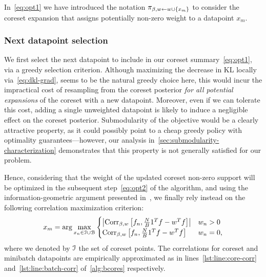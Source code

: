 In~\cref{eq:opt1} we have introduced the notation $\pi_{\beta,w \leftarrow w \cup \{x_{m}\}}$ to consider the coreset expansion that assigns potentially non-zero weight to a datapoint $x_m$.

\subsubsection{Next datapoint selection}
We first select the next datapoint to include in our coreset summary~\cref{eq:opt1}, via a greedy selection criterion. Although maximizing the decrease in KL locally via~\cref{eq:dkl-grad}, seems to be the natural greedy choice here, this would incur the impractical cost of resampling from the coreset posterior \emph{for all potential expansions} of the coreset with a new datapoint. Moreover, even if we can tolerate this cost, adding a single unweighted datapoint is likely to induce a negligible effect on the coreset posterior. Submodularity of the objective would be a clearly attractive property, as it could possibly point to a cheap greedy policy with optimality guarantees---however, our analysis in~\cref{sec:submodularity-characterization} demonstrates that this property is not generally satisfied for our problem. 

Hence, considering that the weight of the updated coreset non-zero support will be optimized in the subsequent step~\cref{eq:opt2} of the algorithm, and using the information-geometric argument presented in~, we finally rely instead on the following correlation maximization criterion:
\[
x_{m} = \arg \underset{x_n \in \mathcal{I} \cup \mathcal{B} }{\max}
\begin{cases}
	\left|\operatorname{Corr}_{\beta,w}\left[f_n, \frac{N}{B}1^Tf - w^T f\right]\right| & w_n>0 \\
	\operatorname{Corr}_{\beta,w}\left[f_n, \frac{N}{B}1^Tf - w^T f\right] & w_n=0,
\end{cases}
\label{eq:greedy-select}
\]
where we denoted by $\mathcal{I}$ the set of coreset points.
The correlations for coreset and minibatch datapoints are empirically approximated  as in lines~\ref{lst:line:core-corr} and~\ref{lst:line:batch-corr} of~\cref{alg:bcores} respectively.
\begin{comment}
\[
\hcorr = \diag \left[ \frac{1}{S} \sum_{s=1}^{S} g_s g_s^T \right]^{-\frac{1}{2}} \left(\frac{1}{S} \sum_{s=1}^{S} g_s \left(\frac{N}{B}1^Tg_s- w^Tg_s\right) \right),
\label{eq:empirical-corr}
\]
where 
 \[
 g_s:= \begin{bmatrix}
		f_1(\theta_s) \\
		\vdots \\
		f_N(\theta_s)
\end{bmatrix}
-
\frac{1}{S}\sum_{r=1}^{S}
 \begin{bmatrix}
f_1(\theta_r) \\
\vdots \\
f_N(\theta_r)
\end{bmatrix}.
\label{eq:sampled-potentials}
\]
\end{comment}

